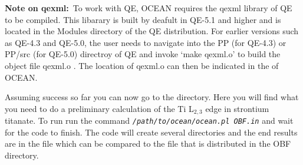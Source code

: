 \documentclass[11pt]{report}
\begin{document}
\textbf{Note on qexml:}~To work with QE, OCEAN requires the qexml library of QE to be compiled. This libarary is built by deafult in QE-5.1 and higher 
and is located in the Modules directory of the QE distribution. For earlier versions such as QE-4.3 and QE-5.0, the user needs to navigate 
into the PP (for QE-4.3) or PP/src (for QE-5.0) directroy of QE and invoke `make qexml.o' to build the object file qexml.o . The 
location of qexml.o can then be indicated in the  of OCEAN.

Assuming success so far you can now go to the  directory. Here you will find what you need to do a preliminary 
calculation of the Ti L$_{2,3}$ edge in strontium titanate. To run  run the command \texttt{\textsl{/path/to/ocean/ocean.pl OBF.in}}  
and wait for the code to finish. The code will create several directories and the end results are in the file  which can 
be compared to the  file that is distributed in the OBF directory.  




\end{document}
